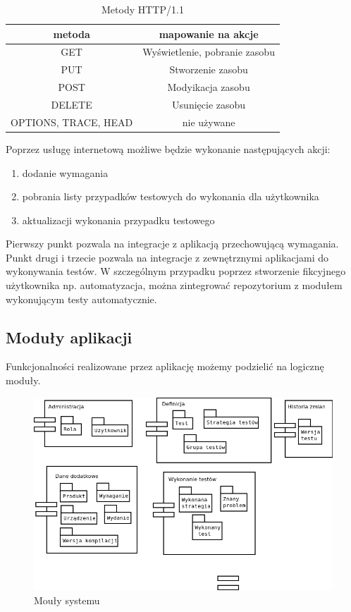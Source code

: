 \begin{table}	
	\centering
\begin{tabular}{|c|c|}
\textbf{metoda} & \textbf{mapowanie na akcje} \\ \hline
GET & Wyświetlenie, pobranie zasobu \\ \hline
PUT & Stworzenie zasobu \\ \hline
POST & Modyikacja zasobu \\ \hline
DELETE & Usunięcie zasobu \\ \hline
OPTIONS, TRACE, HEAD & nie używane \\ \hline
\end{tabular}
\caption{Metody HTTP/1.1 \cite{http}}
\end{table}

Poprzez usługę internetową możliwe będzie wykonanie następujących akcji:
\begin{enumerate}
  \item dodanie wymagania
  \item pobrania listy przypadków testowych do wykonania dla użytkownika
  \item aktualizacji wykonania przypadku testowego
\end{enumerate}
Pierwszy punkt pozwala na integracje z aplikacją przechowującą wymagania. Punkt drugi i trzecie pozwala na integracje z zewnętrznymi aplikacjami do wykonywania testów. W szczególnym przypadku poprzez stworzenie fikcyjnego użytkownika np. automatyzacja, można zintegrować repozytorium z modułem wykonującym testy automatycznie.


\subsection{Moduły aplikacji}
Funkcjonalności realizowane przez aplikację możemy podzielić na logicznę moduły.
\begin{figure}[h]
\centerline{\includegraphics[scale=0.5]{img/komponenty.png}}
\caption{Mouły systemu}
\label{fig:moduly}
\end{figure}

